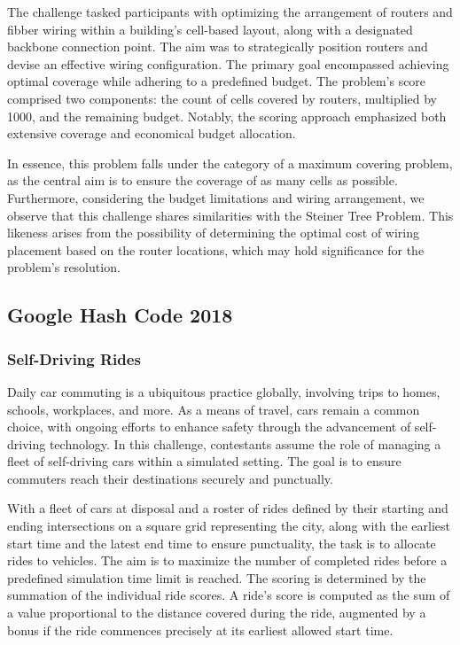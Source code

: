 The challenge tasked participants with optimizing the arrangement of routers and
fibber wiring within a building's cell-based layout, along with a designated
backbone connection point. The aim was to strategically position routers and
devise an effective wiring configuration. The primary goal encompassed achieving
optimal coverage while adhering to a predefined budget. The problem's score
comprised two components: the count of cells covered by routers, multiplied by
1000, and the remaining budget. Notably, the scoring approach emphasized both
extensive coverage and economical budget allocation.

In essence, this problem falls under the category of a maximum covering problem,
as the central aim is to ensure the coverage of as many cells as possible.
Furthermore, considering the budget limitations and wiring arrangement, we
observe that this challenge shares similarities with the Steiner Tree Problem.
This likeness arises from the possibility of determining the optimal cost of
wiring placement based on the router locations, which may hold significance for the
problem's resolution.

\subsection{Google Hash Code 2018}
\label{subsec:hashcode-2018}

\subsubsection*{Self-Driving Rides}
\label{subsubsec:hashcode-2018-qualification}

Daily car commuting is a ubiquitous practice globally, involving trips to homes,
schools, workplaces, and more. As a means of travel, cars remain a common
choice, with ongoing efforts to enhance safety through the advancement of
self-driving technology. In this challenge, contestants assume the role of
managing a fleet of self-driving cars within a simulated setting. The goal is to
ensure commuters reach their destinations securely and punctually.

With a fleet of cars at disposal and a roster of rides defined by their starting
and ending intersections on a square grid representing the city, along with the
earliest start time and the latest end time to ensure punctuality, the task is
to allocate rides to vehicles. The aim is to maximize the number of completed
rides before a predefined simulation time limit is reached. The scoring is
determined by the summation of the individual ride scores. A ride's score is
computed as the sum of a value proportional to the distance covered during the
ride, augmented by a bonus if the ride commences precisely at its earliest
allowed start time.

